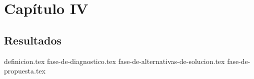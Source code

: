 \chapter{Capítulo IV}
\section{Resultados}
{definicion.tex}
{fase-de-diagnostico.tex}
{fase-de-alternativas-de-solucion.tex}
{fase-de-propuesta.tex}
